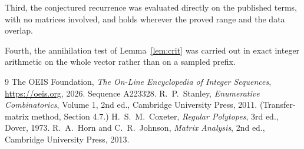 \documentclass[11pt,a4paper]{article}
\theoremstyle{plain}
\theoremstyle{definition}
\begin{document}
Third, the conjectured recurrence was evaluated directly on the published terms, with no
matrices involved, and holds wherever the proved range and the data overlap.

Fourth, the annihilation test of Lemma~\ref{lem:crit} was carried out in exact integer
arithmetic on the whole vector rather than on a sampled prefix.

\begin{thebibliography}{9}
 The OEIS Foundation, \emph{The On-Line Encyclopedia of Integer
Sequences}, \url{https://oeis.org}, 2026. Sequence A223328.
 R.~P.~Stanley, \emph{Enumerative Combinatorics}, Volume 1, 2nd ed.,
Cambridge University Press, 2011. (Transfer-matrix method, Section 4.7.)
 H.~S.~M.~Coxeter, \emph{Regular Polytopes}, 3rd ed., Dover, 1973.
 R.~A.~Horn and C.~R.~Johnson, \emph{Matrix Analysis}, 2nd ed., Cambridge
University Press, 2013.
\end{thebibliography}
\end{document}
